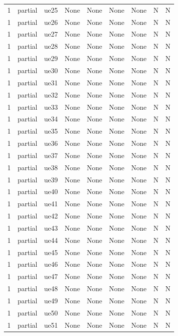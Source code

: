 \begin{table}[ht]
\begin{tabular}{|c|c|c|c|c|c|c|c|c|}
1 & partial & ue25 & None & None & None & None & N & N \\
1 & partial & ue26 & None & None & None & None & N & N \\
1 & partial & ue27 & None & None & None & None & N & N \\
1 & partial & ue28 & None & None & None & None & N & N \\
1 & partial & ue29 & None & None & None & None & N & N \\
1 & partial & ue30 & None & None & None & None & N & N \\
1 & partial & ue31 & None & None & None & None & N & N \\
1 & partial & ue32 & None & None & None & None & N & N \\
1 & partial & ue33 & None & None & None & None & N & N \\
1 & partial & ue34 & None & None & None & None & N & N \\
1 & partial & ue35 & None & None & None & None & N & N \\
1 & partial & ue36 & None & None & None & None & N & N \\
1 & partial & ue37 & None & None & None & None & N & N \\
1 & partial & ue38 & None & None & None & None & N & N \\
1 & partial & ue39 & None & None & None & None & N & N \\
1 & partial & ue40 & None & None & None & None & N & N \\
1 & partial & ue41 & None & None & None & None & N & N \\
1 & partial & ue42 & None & None & None & None & N & N \\
1 & partial & ue43 & None & None & None & None & N & N \\
1 & partial & ue44 & None & None & None & None & N & N \\
1 & partial & ue45 & None & None & None & None & N & N \\
1 & partial & ue46 & None & None & None & None & N & N \\
1 & partial & ue47 & None & None & None & None & N & N \\
1 & partial & ue48 & None & None & None & None & N & N \\
1 & partial & ue49 & None & None & None & None & N & N \\
1 & partial & ue50 & None & None & None & None & N & N \\
1 & partial & ue51 & None & None & None & None & N & N \\

\end{tabular}
\end{table}
